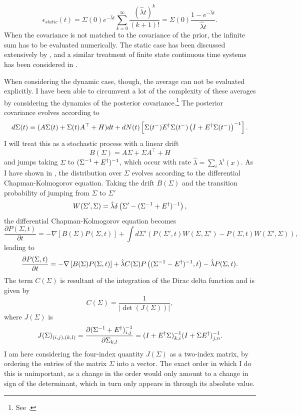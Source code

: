 \begin{equation}
\epsilon_{static}(t) =\Sigma(0)e^{-\hat{\lambda} t}  \sum_{k=0}^\infty  \frac{ (\hat{\lambda}t)^k }{(k+1)!} = \Sigma(0) \frac{1-e^{-\hat{\lambda} t }}{\hat{\lambda} t}.
\end{equation}
When the covariance is not matched to the covariance of the prior, the infinite sum has to be evaluated numerically. 
The static case has been discussed extensively by , and a similar treatment of finite state continuous time systems has been considered in .\par
When considering the dynamic case, though, the average can not be evaluated explicitly. I have been able to circumvent a lot of the complexity of these averages by considering
the dynamics of the posterior covariance.\footnote{See .} The posterior covariance evolves according to
\[
d\Sigma(t) = (A\Sigma(t) + \Sigma(t) A^\top+H)dt + dN(t) \left[\Sigma(t^-) E^\dagger \Sigma(t^-) \left(I+E^\dagger \Sigma(t^-)\right)^{-1}\right].
\]
I will treat this as a stochastic process with a linear drift 
\[
B(\Sigma) = A\Sigma + \Sigma A^\top + H
\]
and jumps taking $\Sigma$ to $(\Sigma^{-1} + E^\dagger)^{-1}$,
which occur with rate $\hat{\lambda} = \sum_i \lambda^i(x)$. As I have shown in , the distribution over $\Sigma$ evolves according to the differential
Chapman-Kolmogorov equation. Taking the drift 
$B(\Sigma)$ and the transition probability of jumping from $\Sigma$ to $\Sigma'$
\[
W(\Sigma',\Sigma) =\hat{\lambda} \delta\left(\Sigma'-(\Sigma^{-1}+E^\dagger)^{-1}\right),
\]
the differential Chapman-Kolmogorov equation becomes
\[
\frac{\partial P(\Sigma,t)}{\partial t} = -\nabla \left[B(\Sigma) P(\Sigma,t)\right] + \int d\Sigma' \left( P(\Sigma',t)W(\Sigma,\Sigma') - P(\Sigma,t)W(\Sigma',\Sigma)\right),
\]
leading to
\begin{equation}
\label{eq:sigma_DCKE}
\frac{\partial P(\Sigma,t)}{\partial t} = -\nabla \left[B(\Sigma) P(\Sigma,t)\right] + \hat{\lambda} C(\Sigma) P\left( (\Sigma^{-1} - \covar^\dagger)^{-1},t\right) - \hat{\lambda} P(\Sigma,t).
\end{equation}
The term $C(\Sigma)$ is resultant of the integration of the Dirac delta function and is given by
\[
C(\Sigma) = \frac{1}{|\det(J(\Sigma))|},
\]
where $J(\Sigma)$ is 
\[
J(\Sigma)_{(i,j),(k,l)} = \frac{\partial (\Sigma^{-1}+E^\dagger)^{-1}_{i,j}}{\partial \Sigma_{k,l}} = (I+E^\dagger \Sigma)^{-1}_{k,i}(I+\Sigma E^\dagger)^{-1}_{j,n}.
\]
I am here considering the four-index quantity $J(\Sigma)$ as a two-index matrix, by ordering the entries of the matrix $\Sigma$ into a vector. The exact order in which I do this is 
unimportant, as a change in the order would only amount to a change in sign of the determinant, which in turn only appears in  through its absolute value.\par

